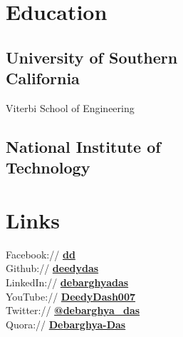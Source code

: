 \documentclass[]{deedy-resume-openfont}
\begin{document}
%
%
\lastupdated

%
%

%
%

\begin{minipage}[t]{0.33\textwidth} 


\section{Education} 

\subsection[University of Southern California]{University of Southern\\ California}
Viterbi School of Engineering
\sectionsep

\subsection[National Institute of Technology]{National Institute of \\ Technology}
\sectionsep


\section{Links} 
Facebook:// \href{https://facebook/dd}{\bf dd} \\
Github:// \href{https://github.com/deedydas}{\bf deedydas} \\
LinkedIn://  \href{https://www.linkedin.com/in/debarghyadas}{\bf debarghyadas} \\
YouTube://  \href{https://www.youtube.com/user/DeedyDash007}{\bf DeedyDash007} \\
Twitter://  \href{https://twitter.com/debarghya_das}{\bf @debarghya\_das} \\
Quora://  \href{https://www.quora.com/Debarghya-Das}{\bf Debarghya-Das}


\end{minipage}
\end{document}
